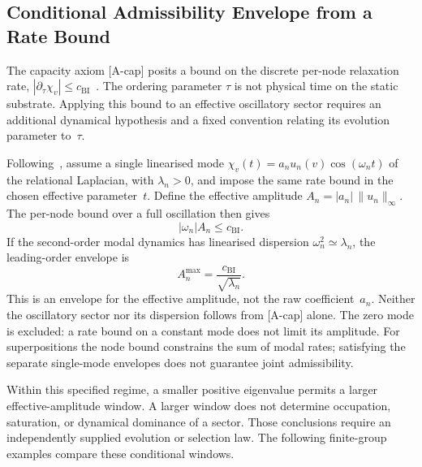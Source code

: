 \subsection{Conditional Admissibility Envelope from a Rate Bound}
  \label{subsec:admissibility-bounded-flux}

  The capacity axiom [A-cap] posits a bound on the discrete per-node relaxation rate,
  $|\partial_\tau\chi_v|\leq c_{\mathrm{BI}}$~\cite{Beau2026c}.
  The ordering parameter $\tau$ is not physical time on the static substrate.
  Applying this bound to an effective oscillatory sector requires an additional dynamical hypothesis
  and a fixed convention relating its evolution parameter to~$\tau$.

  Following~\cite{Beau2026a1}, assume a single linearised mode
  $\chi_v(t)=a_n u_n(v)\cos(\omega_n t)$ of the relational Laplacian, with
  $\lambda_n>0$, and impose the same rate bound in the chosen effective parameter~$t$.
  Define the effective amplitude $A_n=|a_n|\,\|u_n\|_\infty$.
  The per-node bound over a full oscillation then gives
  \begin{equation}
    |\omega_n| A_n \leq c_{\mathrm{BI}}.
  \end{equation}
  If the second-order modal dynamics has linearised dispersion $\omega_n^2\simeq\lambda_n$,
  the leading-order envelope is
  \begin{equation}
    A_n^{\max} = \frac{c_{\mathrm{BI}}}{\sqrt{\lambda_n}}.
    \label{eq:wp-modal-envelope}
  \end{equation}
  This is an envelope for the effective amplitude, not the raw coefficient~$a_n$.
  Neither the oscillatory sector nor its dispersion follows from [A-cap] alone.
  The zero mode is excluded: a rate bound on a constant mode does not limit its amplitude.
  For superpositions the node bound constrains the sum of modal rates; satisfying the separate
  single-mode envelopes does not guarantee joint admissibility.

  Within this specified regime, a smaller positive eigenvalue permits a larger effective-amplitude window.
  A larger window does not determine occupation, saturation, or dynamical dominance of a sector.
  Those conclusions require an independently supplied evolution or selection law.
  The following finite-group examples compare these conditional windows.
